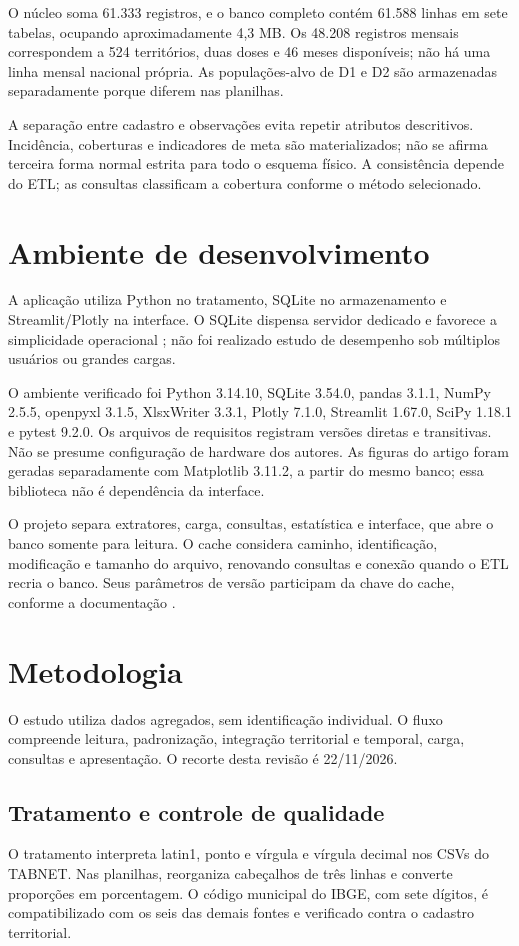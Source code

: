 \documentclass[12pt]{article}
\begin{document}
O núcleo soma 61.333 registros, e o banco completo contém 61.588 linhas em sete tabelas, ocupando aproximadamente 4,3 MB. Os 48.208 registros mensais correspondem a 524 territórios, duas doses e 46 meses disponíveis; não há uma linha mensal nacional própria. As populações-alvo de D1 e D2 são armazenadas separadamente porque diferem nas planilhas.

A separação entre cadastro e observações evita repetir atributos descritivos. Incidência, coberturas e indicadores de meta são materializados; não se afirma terceira forma normal estrita para todo o esquema físico. A consistência depende do ETL; as consultas classificam a cobertura conforme o método selecionado.

\section{Ambiente de desenvolvimento}
A aplicação utiliza Python no tratamento, SQLite no armazenamento e Streamlit/Plotly na interface. O SQLite dispensa servidor dedicado e favorece a simplicidade operacional \cite{sqlite}; não foi realizado estudo de desempenho sob múltiplos usuários ou grandes cargas.

O ambiente verificado foi Python 3.14.10, SQLite 3.54.0, pandas 3.1.1, NumPy 2.5.5, openpyxl 3.1.5, XlsxWriter 3.3.1, Plotly 7.1.0, Streamlit 1.67.0, SciPy 1.18.1 e pytest 9.2.0. Os arquivos de requisitos registram versões diretas e transitivas. Não se presume configuração de hardware dos autores. As figuras do artigo foram geradas separadamente com Matplotlib 3.11.2, a partir do mesmo banco; essa biblioteca não é dependência da interface.

O projeto separa extratores, carga, consultas, estatística e interface, que abre o banco somente para leitura. O cache considera caminho, identificação, modificação e tamanho do arquivo, renovando consultas e conexão quando o ETL recria o banco. Seus parâmetros de versão participam da chave do cache, conforme a documentação \cite{streamlitcache}.

\section{Metodologia}
O estudo utiliza dados agregados, sem identificação individual. O fluxo compreende leitura, padronização, integração territorial e temporal, carga, consultas e apresentação. O recorte desta revisão é 22/11/2026.

\subsection{Tratamento e controle de qualidade}
O tratamento interpreta latin1, ponto e vírgula e vírgula decimal nos CSVs do TABNET. Nas planilhas, reorganiza cabeçalhos de três linhas e converte proporções em porcentagem. O código municipal do IBGE, com sete dígitos, é compatibilizado com os seis das demais fontes e verificado contra o cadastro territorial.
\end{document}

